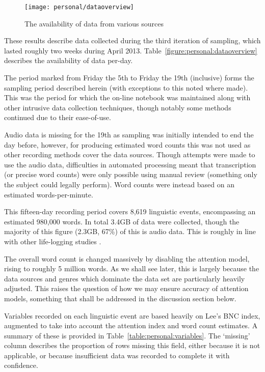 

\begin{figure}[hp]
    \centering
    \texttt{[image: personal/dataoverview]}
    \caption{The availability of data from various sources}
    \label{fig:personal:dataoverview}
\end{figure}


These results describe data collected during the third iteration of sampling, which lasted roughly two weeks during April 2013.  Table~\ref{figure:personal:dataoverview} describes the availability of data per-day.

The period marked from Friday the 5th to Friday the 19th (inclusive) forms the sampling period described herein (with exceptions to this noted where made).  This was the period for which the on-line notebook was maintained along with other intrusive data collection techniques, though notably some methods continued due to their ease-of-use.

Audio data is missing for the 19th as sampling was initially intended to end the day before, however, for producing estimated word counts this was not used as other recording methods cover the data sources.  Though attempts were made to use the audio data, difficulties in automated processing meant that transcription (or precise word counts) were only possible using manual review (something only the subject could legally perform).  Word counts were instead based on an estimated words-per-minute.


This fifteen-day recording period covers 8,619 linguistic events, encompassing an estimated 980,000 words.  In total 3.4GB of data were collected, though the majority of this figure (2.3GB, 67\%) of this is audio data.  This is roughly in line with other life-logging studies .

The overall word count is changed massively by disabling the attention model, rising to roughly 5 million words.  As we shall see later, this is largely because the data sources and genres which dominate the data set are particularly heavily adjusted.  This raises the question of how we may ensure accuracy of attention models, something that shall be addressed in the discussion section below.




Variables recorded on each linguistic event are based heavily on Lee's BNC index, augmented to take into account the attention index and word count estimates.  A summary of these is provided in Table~\ref{table:personal:variables}.  The `missing' column describes the proportion of rows missing this field, either because it is not applicable, or because insufficient data was recorded to complete it with confidence.

